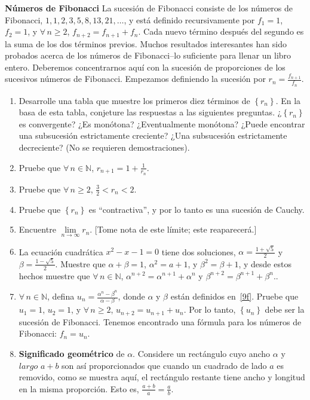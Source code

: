 \begin{prob}
\textbf{Números de Fibonacci} La sucesión de Fibonacci consiste de los números de Fibonacci, $1,1,2,3,5,8,13,21,\ldots$, y está definido recursivamente por $f_{1}=1$, $f_{2}=1$, y $\forall\,n\geq2$, $f_{n+2}=f_{n+1}+f_{n}$. Cada nuevo término después del segundo es la suma de los dos términos previos. Muchos resultados interesantes han sido probados acerca de los números de Fibonacci--lo suficiente para llenar un libro entero. Deberemos concentrarnos aquí con la sucesión de proporciones de los sucesivos números de Fibonacci. Empezamos definiendo la sucesión por $r_{n}=\frac{f_{n+1}}{f_{n}}$.
\begin{enumerate}
	\item Desarrolle una tabla que muestre los primeros diez términos de $\left\{r_{n}\right\}$. En la basa de esta tabla, conjeture las respuestas a las siguientes preguntas. ¿$\left\{r_{n}\right\}$ es convergente? ¿Es monótona? ¿Eventualmente monótona? ¿Puede encontrar una subsucesión estrictamente creciente? ¿Una subsucesión estrictamente decreciente? (No se requieren demostraciones).
	\item Pruebe que $\forall\,n\in\mathbb{N}$, $r_{n+1}=1+\frac{1}{r_{n}}$.
	\item Pruebe que $\forall\,n\geq2$, $\frac{3}{2}<r_{n}<2$.
	\item Pruebe que $\left\{r_{n}\right\}$ es ``contractiva'', y por lo tanto es una sucesión de Cauchy.
	\item Encuentre $\lim\limits_{n\to\infty}r_{n}$. [Tome nota de este límite; este reaparecerá.]
	\item La ecuación cuadrática $x^{2}-x-1=0$ tiene dos soluciones, $\alpha=\frac{1+\sqrt{5}}{2}$ y $\beta=\frac{1-\sqrt{5}}{2}$. Muestre que $\alpha+\beta=1$, $\alpha^{2}=a+1$, y $\beta^{2}=\beta+1$, y desde estos hechos muestre que $\forall\,n\in\mathbb{N}$, $\alpha^{n+2}=\alpha^{n+1}+\alpha^{n}$ y $\beta^{n+2}=\beta^{n+1}+\beta^{n}$..\label{9f}
	\item $\forall\,n\in\mathbb{N}$, defina $u_{n}=\frac{\alpha^{n}-\beta^{n}}{\alpha-\beta}$, donde $\alpha$ y $\beta$ están definidos en~\ref{9f}. Pruebe que $u_{1}=1$, $u_{2}=1$, y $\forall\,n\geq2$, $u_{n+2}=u_{n+1}+u_{n}$. Por lo tanto, $\left\{u_{n}\right\}$ debe ser la sucesión de Fibonacci. Tenemos encontrado una fórmula para los números de Fibonacci: $f_{n}=u_{n}$.
	\item \textbf{Significado geométrico} de $\alpha$. Considere un rectángulo cuyo ancho $\alpha$ y $largo$ $a+b$ son así proporcionados que cuando un cuadrado de lado $a$ es removido, como se muestra aquí, el rectángulo restante tiene ancho y longitud en la misma proporción. Esto es, $\frac{a+b}{a}=\frac{a}{b}$.
	

\end{enumerate}
\end{prob}
